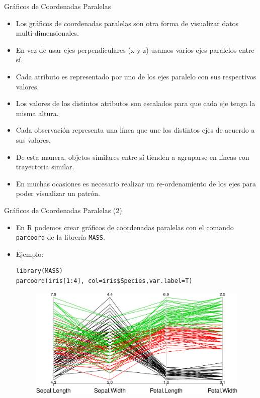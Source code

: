 \documentclass[handout]{beamer}
\begin{document}
\begin{frame}[fragile]{Gráficos de Coordenadas Paralelas}
\scriptsize{
 \begin{itemize}
  \item Los gráficos de coordenadas paralelas son otra forma de visualizar datos multi-dimensionales.
  \item En vez de usar ejes perpendiculares (x-y-z) usamos varios ejes paralelos entre sí.
  \item Cada atributo es representado por uno de los ejes paralelo con sus respectivos valores.
  \item Los valores de los distintos atributos son escalados para que cada eje tenga la misma altura.
  \item Cada observación representa una línea que une los distintos ejes de acuerdo a sus valores.
  \item De esta manera, objetos similares entre sí tienden a agruparse en líneas con trayectoria similar.
  \item En muchas ocasiones es necesario realizar un re-ordenamiento de los ejes para poder visualizar un patrón.
 \end{itemize} 
 
 }  
\end{frame}


\begin{frame}[fragile]{Gráficos de Coordenadas Paralelas (2)}
\scriptsize{
 \begin{itemize}
  \item En R podemos crear gráficos de coordenadas paralelas con el comando \verb+parcoord+ de la librería \verb+MASS+.
  \item Ejemplo:
  \begin{verbatim}
library(MASS)
parcoord(iris[1:4], col=iris$Species,var.label=T)   
  \end{verbatim}
  
  \begin{figure}[h!]
	\centering
	\includegraphics[scale=0.5]{imagenes/parallel.pdf}		
\end{figure}   

 \end{itemize} 
 
 }  
\end{frame}
\end{document}
